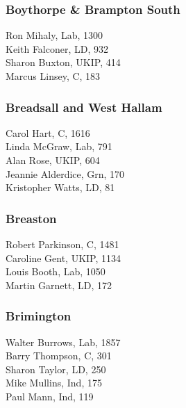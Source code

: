\documentclass[a4paper,openany,10pt]{book}
\begin{document}
\subsubsection*{Boythorpe \& Brampton South}



Ron Mihaly, Lab, 1300\\
Keith Falconer, LD, 932\\
Sharon Buxton, UKIP, 414\\
Marcus Linsey, C, 183\\


\subsubsection*{Breadsall and West Hallam}



Carol Hart, C, 1616\\
Linda McGraw, Lab, 791\\
Alan Rose, UKIP, 604\\
Jeannie Alderdice, Grn, 170\\
Kristopher Watts, LD, 81\\


\subsubsection*{Breaston}



Robert Parkinson, C, 1481\\
Caroline Gent, UKIP, 1134\\
Louis Booth, Lab, 1050\\
Martin Garnett, LD, 172\\


\subsubsection*{Brimington}



Walter Burrows, Lab, 1857\\
Barry Thompson, C, 301\\
Sharon Taylor, LD, 250\\
Mike Mullins, Ind, 175\\
Paul Mann, Ind, 119\\
\end{document}
